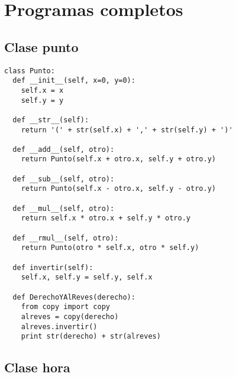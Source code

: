 

%
\chapter{Programas completos}


\section{Clase punto}

\beforeverb
\begin{verbatim}
class Punto:
  def __init__(self, x=0, y=0):
    self.x = x
    self.y = y

  def __str__(self):
    return '(' + str(self.x) + ',' + str(self.y) + ')'

  def __add__(self, otro):
    return Punto(self.x + otro.x, self.y + otro.y)

  def __sub__(self, otro):
    return Punto(self.x - otro.x, self.y - otro.y)

  def __mul__(self, otro):
    return self.x * otro.x + self.y * otro.y

  def __rmul__(self, otro):
    return Punto(otro * self.x, otro * self.y)

  def invertir(self):
    self.x, self.y = self.y, self.x

  def DerechoYAlReves(derecho):
    from copy import copy
    alreves = copy(derecho)
    alreves.invertir()
    print str(derecho) + str(alreves)
\end{verbatim}
\afterverb


\section{Clase hora}

